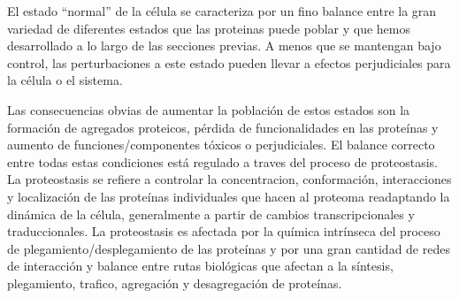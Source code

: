 
El estado ``normal'' de la célula se caracteriza por un fino balance entre la gran variedad de diferentes estados que las proteinas puede poblar y que hemos desarrollado a lo largo de las secciones previas.
A menos que se mantengan bajo control, las perturbaciones a este estado pueden llevar a efectos perjudiciales para la célula o el sistema. 

Las consecuencias obvias de aumentar la población de estos estados son la formación de agregados proteicos, pérdida de funcionalidades en las proteínas y aumento de funciones/componentes tóxicos o perjudiciales.
El balance correcto entre todas estas condiciones está regulado a traves del proceso de proteostasis.
La proteostasis se refiere a controlar la concentracion, conformación, interacciones y localización de las proteínas individuales que hacen al proteoma readaptando la dinámica de la célula, 
generalmente a partir de cambios transcripcionales y traduccionales.
La proteostasis es afectada por la química intrínseca del proceso de plegamiento/desplegamiento de las proteínas y por una gran cantidad de redes de interacción y balance entre rutas biológicas que afectan a la síntesis, plegamiento, 
trafico, agregación y desagregación de proteínas.


